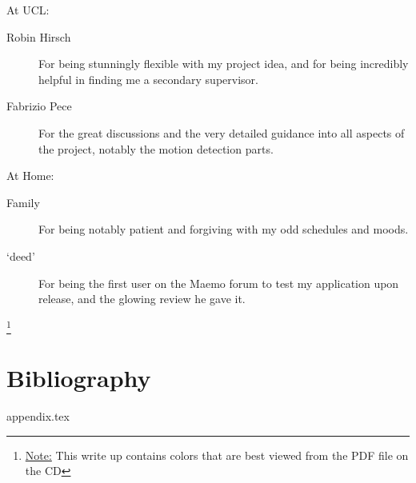 \documentclass[11pt]{article} %
\begin{document}
	\begin{description}
	\item At UCL:
		\begin{description}
		\item [Robin Hirsch] For being stunningly flexible with my project idea, and for being incredibly helpful in finding me a secondary supervisor.
		\item [Fabrizio Pece] For the great discussions and the very detailed guidance into all aspects of the project, notably the motion detection parts.
		\end{description}
	\item At Home:
		\begin{description}
		\item [Family] For being notably patient and forgiving with my odd schedules and moods.
		\item [‘deed’] For being the first user on the Maemo forum to test my application upon release, and the glowing review he gave it.
		\end{description}		
	\end{description}
\let\thefootnote\relax\footnote{\underline{Note:} This write up contains colors that are best viewed from the PDF file on the CD}
\pagebreak


\part{Bibliography}

{appendix.tex}
\end{document}
